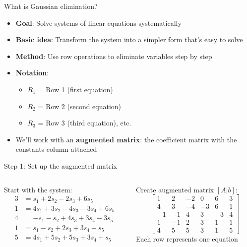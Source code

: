 \documentclass[aspectratio=169, lualatex, handout]{beamer}
\begin{document}
\begin{frame}{What is Gaussian elimination?}
	\begin{itemize}
		\item \textbf{Goal}: Solve systems of linear equations systematically
		\item \textbf{Basic idea}: Transform the system into a simpler form that's easy to solve
		\item \textbf{Method}: Use row operations to eliminate variables step by step
		\item \textbf{Notation}:
		      \begin{itemize}
			      \item $R_1$ = Row 1 (first equation)
			      \item $R_2$ = Row 2 (second equation)
			      \item $R_3$ = Row 3 (third equation), etc.
		      \end{itemize}
		\item We'll work with an \textbf{augmented matrix}: the coefficient matrix with the constants column attached
	\end{itemize}
\end{frame}

\begin{frame}{Step 1: Set up the augmented matrix}
	\begin{columns}[c]
		\begin{column}{0.5\textwidth}
			Start with the system:
			\begin{align*}
				3 & = s_1 + 2s_2 - 2s_3 + 6s_5         \\
				1 & = 4s_1 + 3s_2 - 4s_3 - 3s_4 + 6s_5 \\
				4 & = -s_1 - s_2 + 4s_3 + 3s_4 - 3s_5  \\
				1 & = s_1 - s_2 + 2s_3 + 3s_4 + s_5    \\
				5 & = 4s_1 + 5s_2 + 5s_3 + 3s_4 + s_5
			\end{align*}
		\end{column}
		\begin{column}{0.5\textwidth}
			Create augmented matrix $[A|b]$:
			\[
				\left[\begin{array}{ccccc|c}
						1  & 2  & -2 & 0  & 6  & 3 \\
						4  & 3  & -4 & -3 & 6  & 1 \\
						-1 & -1 & 4  & 3  & -3 & 4 \\
						1  & -1 & 2  & 3  & 1  & 1 \\
						4  & 5  & 5  & 3  & 1  & 5
					\end{array}\right]
			\]
			Each row represents one equation
		\end{column}
	\end{columns}
\end{frame}
\end{document}
